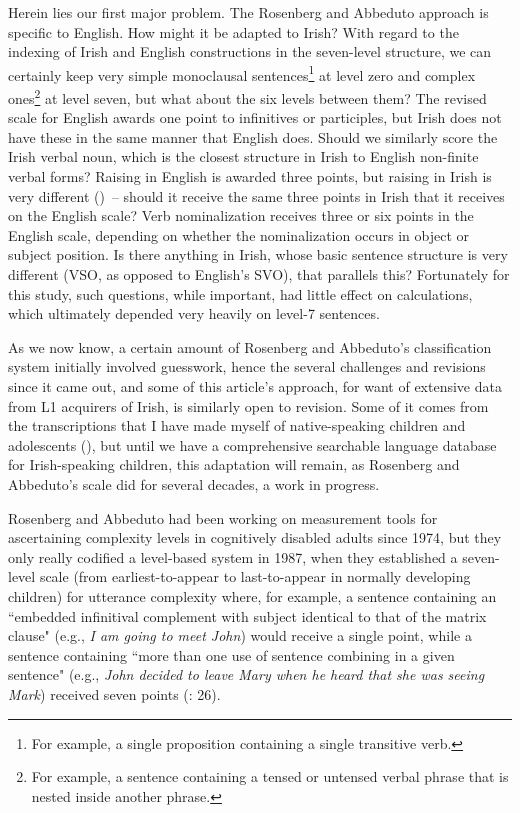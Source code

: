 \documentclass[output=paper,colorlinks,citecolor=brown]{langscibook}
\begin{document}
Herein lies our first major problem. The Rosenberg and Abbeduto approach is specific to English. How might it be adapted to Irish? With regard to the indexing of Irish and English constructions in the seven-level structure, we can certainly keep very simple monoclausal sentences\footnote{For example, a single proposition containing a single transitive verb.} at level zero and complex ones\footnote{For example, a sentence containing a tensed or untensed verbal phrase that is nested inside another phrase.} at level seven, but what about the six levels between them? The revised scale for English awards one point to infinitives or participles, but Irish does not have these in the same manner that English does. Should we similarly score the Irish verbal noun, which is the closest structure in Irish to English non-finite verbal forms? Raising in English is awarded three points, but raising in Irish is very different (\cite{ob:McCloskey1989})~-- should it receive the same three points in Irish that it receives on the English scale? Verb nominalization receives three or six points in the English scale, depending on whether the nominalization occurs in object or subject position. Is there anything in Irish, whose basic sentence structure is very different (VSO, as opposed to English's SVO), that parallels this? Fortunately for this study, such questions, while important, had little effect on calculations, which ultimately depended very heavily on level-7 sentences.

As we now know, a certain amount of Rosenberg and Abbeduto's classification system initially involved guesswork, hence the several challenges and revisions since it came out, and some of this article's approach, for want of extensive data from L1 acquirers of Irish, is similarly open to revision. Some of it comes from the transcriptions that I have made myself of native-speaking children and adolescents (\cite{ob:OBroin2014}), but until we have a comprehensive searchable language database for Irish-speaking children, this adaptation will remain, as Rosenberg and Abbeduto's scale did for several decades, a work in progress.

Rosenberg and Abbeduto had been working on measurement tools for ascertaining complexity levels in cognitively disabled adults since 1974, but they only really codified a level-based system in 1987, when they established a seven-level scale (from earliest-to-appear to last-to-appear in normally developing children) for utterance complexity where, for example, a sentence containing an ``embedded infinitival complement with subject identical to that of the matrix clause" (e.g., \textit{I am going to meet John}) would receive a single point, while a sentence containing ``more than one use of sentence combining in a given sentence" (e.g., \textit{John decided to leave Mary when he heard that she was seeing Mark}) received seven points (\citealt{ob:RosenbergAbbeduto1987}: 26).
\end{document}
